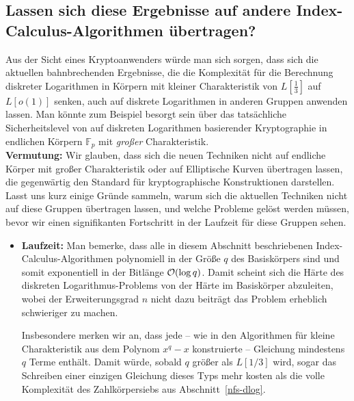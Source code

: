 \begin{refsegment}
\subsection{Lassen sich diese Ergebnisse auf andere
Index-Calculus-Algo\-rithmen übertragen?}

Aus der Sicht eines Kryptoanwenders würde man sich sorgen, dass sich die aktuellen bahnbrechenden Ergebnisse, die die Komplexität für die Berechnung diskreter Logarithmen in Körpern mit kleiner Charakteristik von $L[\frac 1 3]$ auf $L[o(1)]$ senken, auch auf diskrete Logarithmen in anderen Gruppen anwenden lassen. Man könnte zum Beispiel besorgt sein über das tatsächliche Sicherheitslevel von auf diskreten Logarithmen basierender Kryptographie in endlichen Körpern $\mathbb{F}_p$ mit {\em großer} Charakteristik.\\[0.1cm]

\textbf{Vermutung:} Wir glauben, dass sich die neuen Techniken nicht auf endliche Körper mit großer Charakteristik oder auf Elliptische Kurven übertragen lassen, die gegenwärtig den Standard für kryptographische Konstruktionen darstellen.\\[0.1cm]

Lasst uns kurz einige Gründe sammeln, warum sich die aktuellen Techniken nicht auf diese Gruppen übertragen lassen, und welche Probleme gelöst werden müssen, bevor wir einen signifikanten Fortschritt in der Laufzeit für diese Gruppen sehen.

\begin{itemize}
\item \textbf{Laufzeit:} Man bemerke, dass alle in diesem Abschnitt beschriebenen Index-Calculus-Algorithmen polynomiell in der Größe $q$ des Basiskörpers sind und somit exponentiell in der Bitlänge ${\cal O}(\log q)$. Damit scheint sich die Härte des diskreten Logarithmus-Problems von der Härte im Basiskörper abzuleiten, wobei der Erweiterungsgrad $n$ nicht dazu beiträgt das Problem erheblich schwieriger zu machen.

Insbesondere merken wir an, dass jede -- wie in den Algorithmen für kleine Charakteristik aus dem Polynom $x^q-x$ konstruierte -- Gleichung mindestens $q$ Terme enthält. Damit würde, sobald $q$ größer als $L[1/3]$ wird, sogar das Schreiben einer einzigen Gleichung dieses Typs mehr kosten als die volle Komplexität des Zahlkörpersiebs aus Abschnitt~\ref{nfs-dlog}.


\end{itemize}
\end{refsegment}
